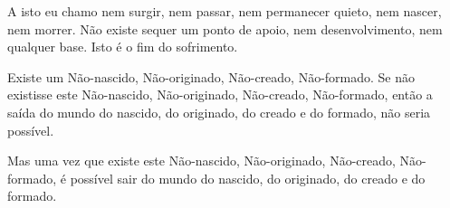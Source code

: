 A isto eu chamo nem surgir, nem passar, nem permanecer quieto, nem nascer, nem
morrer. Não existe sequer um ponto de apoio, nem desenvolvimento, nem qualquer
base. Isto é o fim do sofrimento.


Existe um Não-nascido, Não-originado, Não-creado, Não-formado. Se não existisse
este Não-nascido, Não-originado, Não-creado, Não-formado, então a saída do mundo
do nascido, do originado, do creado e do formado, não seria possível.

Mas uma vez que existe este Não-nascido, Não-originado, Não-creado, Não-formado,
é possível sair do mundo do nascido, do originado, do creado e do formado.

